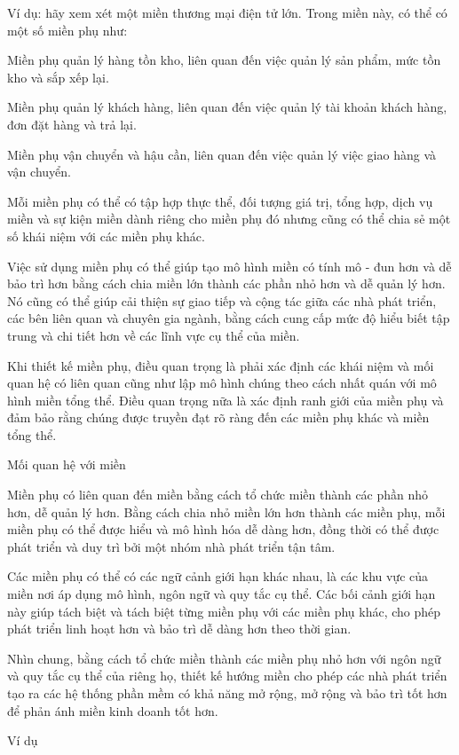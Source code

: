 Ví dụ: hãy xem xét một miền thương mại điện tử lớn. Trong miền này, có thể có một số miền phụ như:

Miền phụ quản lý hàng tồn kho, liên quan đến việc quản lý sản phẩm, mức tồn kho và sắp xếp lại.

Miền phụ quản lý khách hàng, liên quan đến việc quản lý tài khoản khách hàng, đơn đặt hàng và trả lại.

Miền phụ vận chuyển và hậu cần, liên quan đến việc quản lý việc giao hàng và vận chuyển.

Mỗi miền phụ có thể có tập hợp thực thể, đối tượng giá trị, tổng hợp, dịch vụ miền và sự kiện miền dành riêng cho miền phụ đó nhưng cũng có thể chia sẻ một số khái niệm với các miền phụ khác.

Việc sử dụng miền phụ có thể giúp tạo mô hình miền có tính mô - đun hơn và dễ bảo trì hơn bằng cách chia miền lớn thành các phần nhỏ hơn và dễ quản lý hơn. Nó cũng có thể giúp cải thiện sự giao tiếp và cộng tác giữa các nhà phát triển, các bên liên quan và chuyên gia ngành, bằng cách cung cấp mức độ hiểu biết tập trung và chi tiết hơn về các lĩnh vực cụ thể của miền.

Khi thiết kế miền phụ, điều quan trọng là phải xác định các khái niệm và mối quan hệ có liên quan cũng như lập mô hình chúng theo cách nhất quán với mô hình miền tổng thể. Điều quan trọng nữa là xác định ranh giới của miền phụ và đảm bảo rằng chúng được truyền đạt rõ ràng đến các miền phụ khác và miền tổng thể.

Mối quan hệ với miền

Miền phụ có liên quan đến miền bằng cách tổ chức miền thành các phần nhỏ hơn, dễ quản lý hơn. Bằng cách chia nhỏ miền lớn hơn thành các miền phụ, mỗi miền phụ có thể được hiểu và mô hình hóa dễ dàng hơn, đồng thời có thể được phát triển và duy trì bởi một nhóm nhà phát triển tận tâm.

Các miền phụ có thể có các ngữ cảnh giới hạn khác nhau, là các khu vực của miền nơi áp dụng mô hình, ngôn ngữ và quy tắc cụ thể. Các bối cảnh giới hạn này giúp tách biệt và tách biệt từng miền phụ với các miền phụ khác, cho phép phát triển linh hoạt hơn và bảo trì dễ dàng hơn theo thời gian.

Nhìn chung, bằng cách tổ chức miền thành các miền phụ nhỏ hơn với ngôn ngữ và quy tắc cụ thể của riêng họ, thiết kế hướng miền cho phép các nhà phát triển tạo ra các hệ thống phần mềm có khả năng mở rộng, mở rộng và bảo trì tốt hơn để phản ánh miền kinh doanh tốt hơn.

Ví dụ

